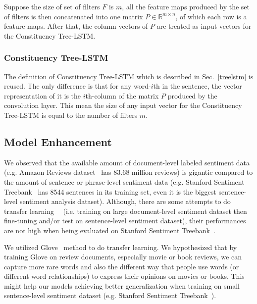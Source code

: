 Suppose the size of set of filters \(F\) is \(m\), all the feature maps produced by the set of filters is then concatenated into one matrix \(P \in \mathbb{R}^{m \times n}\), of which each row is a feature maps.
After that, the column vectors of \(P\) are treated as input vectors for the Constituency Tree-LSTM.
\subsubsection{Constituency Tree-LSTM}
The definition of Constituency Tree-LSTM which is described in Sec.~\ref{treelstm} is reused.
The only difference is that for any word-\(i\)th in the sentence, the vector representation of it is the \(i\)th-column of the matrix \(P\) produced by the convolution layer.
This mean the size of any input vector for the Constituency Tree-LSTM is equal to the number of filters \(m\).
\subsection{Model Enhancement}
We observed that the available amount of document-level labeled sentiment data (e.g. Amazon Reviews dataset~\cite{amazon-reviews} has 83.68 million reviews) is gigantic compared to the amount of sentence or phrase-level sentiment data (e.g. Stanford Sentiment Treebank~\cite{socher2013recursive} has 8544 sentences in its training set, even it is the biggest sentence-level sentiment analysis dataset).
Although, there are some attempts to do transfer learning~\cite{group-instance}~\cite{re-embedding} (i.e. training on large document-level sentiment dataset then fine-tuning and/or test on sentence-level sentiment dataset), their performances are not high when being evaluated on Stanford Sentiment Treebank~\cite{group-instance}.

We utilized Glove~\cite{glove} method to do transfer learning.
We hypothesized that by training Glove on review documents, especially movie or book reviews, we can capture more rare words and also the different way that people use words (or different word relationships) to express their opinions on movies or books.
This might help our models achieving better generalization when training on small sentence-level sentiment dataset (e.g. Stanford Sentiment Treebank~\cite{socher2013recursive}).